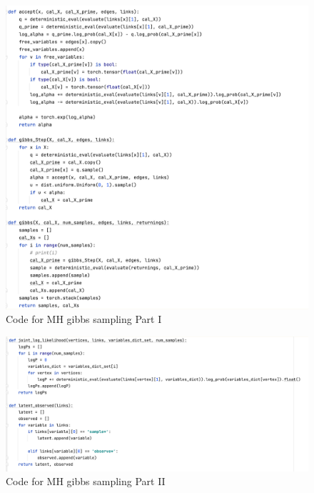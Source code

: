 \documentclass{article}
\begin{document}
\begin{enumerate}
\begin{figure}[!ht]
	\centering
	\includegraphics[scale=0.5]{../figs/Gibbs_1}
	\caption{Code for MH gibbs sampling Part I}
\end{figure}

\begin{figure}
	\centering
	\includegraphics[scale=0.5]{../figs/Gibbs_2}
	\caption{Code for MH gibbs sampling Part II}
\end{figure}


\end{enumerate}
\end{document}
